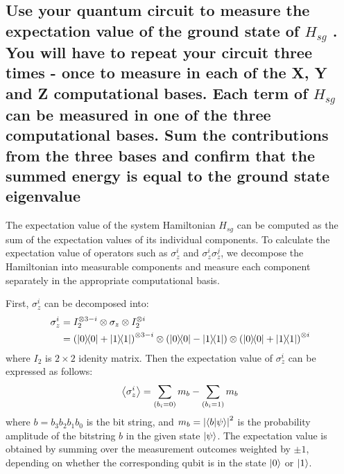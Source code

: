 \documentclass[a4paper, 11pt]{article}
\begin{document}
\subsection*{Use your quantum circuit to measure the expectation value of the ground state of $H_{sg}$ . You will have to repeat your circuit three times - once to measure in each of the X, Y and Z computational bases. Each term of $H_{sg}$ can be measured in one of the three computational bases. Sum the contributions from the three bases and confirm that the summed energy is equal to the ground state eigenvalue}

The expectation value of the system Hamiltonian $H_{sg}$ can be computed as the sum of the expectation values of its individual components. 
To calculate the expectation value of operators such as $\sigma_{z}^{i}$ and $\sigma_{z}^{i}\sigma_{z}^{j}$,
we decompose the Hamiltonian into measurable components and measure each component separately in the appropriate computational basis.

First, $\sigma_{z}^{i}$ can be decomposed into:
\begin{align*}
  \sigma_{z}^{i} &= I_{2}^{\otimes 3-i} \otimes \sigma_{z} \otimes I_{2}^{\otimes i} \\
  &=  \left(\ketbra{0} + \ketbra{1}\right)^{\otimes 3-i} \otimes \left(\ketbra{0} - \ketbra{1}\right) \otimes \left(\ketbra{0} + \ketbra{1}\right)^{\otimes i} \\
\end{align*}
where $I_2$ is $2\times 2$ idenity matrix.
Then the expectation value of $\sigma_{z}^{i}$ can be expressed as follows: 
\begin{align}
  \expectationvalue{\sigma_{z}^{i}} = \sum_{(b_{i} = 0)} m_{b} - \sum_{(b_{i} = 1)} m_{b}
\end{align}
where $b = b_3 b_2 b_1 b_0$ is the bit string,  and $m_{b} = \left|\bra{b}\ket{\psi}\right|^2$ is the probability amplitude of the bitstring $b$ in the given state $\ket{\psi}$.
The expectation value is obtained by summing over the measurement outcomes weighted by $\pm 1$, 
depending on whether the corresponding qubit is in the state $\ket{0}$ or $\ket{1}$.
\end{document}
